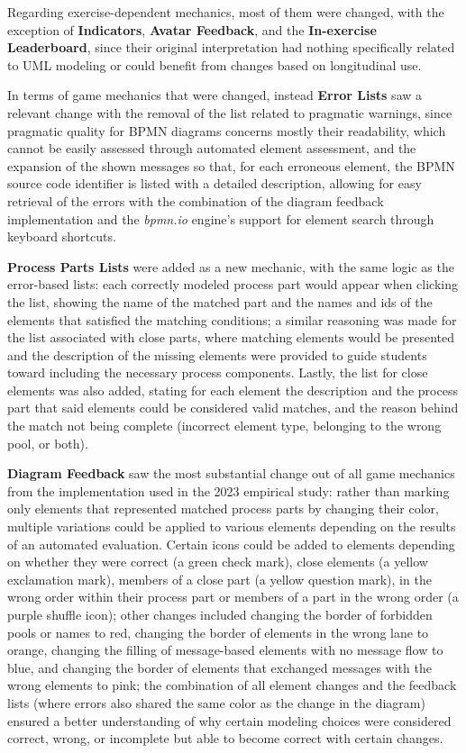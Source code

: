 Regarding exercise-dependent mechanics, most of them were changed, with the exception of \textbf{Indicators}, \textbf{Avatar Feedback}, and the \textbf{In-exercise Leaderboard}, since their original interpretation had nothing specifically related to UML modeling or could benefit from changes based on longitudinal use.

In terms of game mechanics that were changed, instead \textbf{Error Lists} saw a relevant change with the removal of the list related to pragmatic warnings, since pragmatic quality for BPMN diagrams concerns mostly their readability, which cannot be easily assessed through automated element assessment, and the expansion of the shown messages so that, for each erroneous element, the BPMN source code identifier is listed with a detailed description, allowing for easy retrieval of the errors with the combination of the diagram feedback implementation and the \textit{bpmn.io} engine's support for element search through keyboard shortcuts.

\textbf{Process Parts Lists} were added as a new mechanic, with the same logic as the error-based lists: each correctly modeled process part would appear when clicking the list, showing the name of the matched part and the names and ids of the elements that satisfied the matching conditions; a similar reasoning was made for the list associated with close parts, where matching elements would be presented and the description of the missing elements were provided to guide students toward including the necessary process components. Lastly, the list for close elements was also added, stating for each element the description and the process part that said elements could be considered valid matches, and the reason behind the match not being complete (incorrect element type, belonging to the wrong pool, or both).

\textbf{Diagram Feedback} saw the most substantial change out of all game mechanics from the implementation used in the 2023 empirical study: rather than marking only elements that represented matched process parts by changing their color, multiple variations could be applied to various elements depending on the results of an automated evaluation. Certain icons could be added to elements depending on whether they were correct (a green check mark), close elements (a yellow exclamation mark), members of a close part (a yellow question mark), in the wrong order within their process part or members of a part in the wrong order (a purple shuffle icon); other changes included changing the border of forbidden pools or names to red, changing the border of elements in the wrong lane to orange, changing the filling of message-based elements with no message flow to blue, and changing the border of elements that exchanged messages with the wrong elements to pink; the combination of all element changes and the feedback lists (where errors also shared the same color as the change in the diagram) ensured a better understanding of why certain modeling choices were considered correct, wrong, or incomplete but able to become correct with certain changes.

